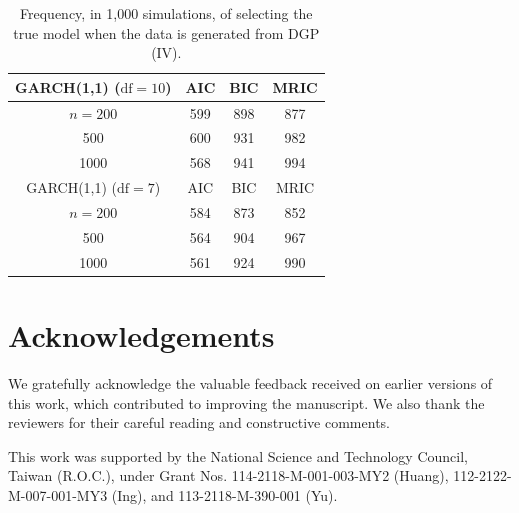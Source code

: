 \documentclass[ejsv2]{imsart}
\theoremstyle{plain}
\theoremstyle{definition}
\theoremstyle{remark}
\begin{document}
\begin{table}
\caption{Frequency, in 1,000 simulations, of selecting the true model when the data is generated from DGP {\rm (IV)}.}
\label{tabS5.2.2}
\centering
\begin{tabular}{cccc}
GARCH(1,1) ($\textrm{df}=10$)  & AIC & BIC & MRIC \\ \hline
   $n= 200$ & 599 & 898 & 877 \\
   500 & 600 & 931 & 982  \\
   1000 & 568 & 941 & 994 \\  \hline
GARCH(1,1) ($\textrm{df}=7$)& AIC & BIC & MRIC \\ \hline
   $n=200$ & 584 & 873 & 852 \\
   500 & 564 & 904 & 967  \\
   1000 & 561 & 924 & 990 \\  \hline
  \end{tabular}
\end{table}

\section*{Acknowledgements}
We gratefully acknowledge the valuable feedback received on earlier versions of this work, which contributed to improving the manuscript. We also thank the reviewers for their careful reading and constructive comments.

\begin{funding}
This work was supported by the National Science and Technology Council, Taiwan (R.O.C.), under Grant Nos. 114-2118-M-001-003-MY2 (Huang), 112-2122-M-007-001-MY3 (Ing), and 113-2118-M-390-001 (Yu).
\end{funding}




\end{document}
